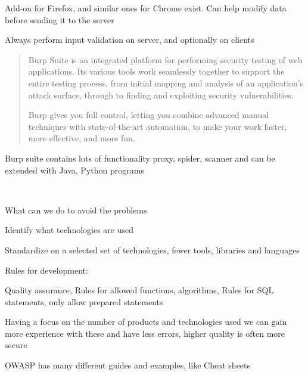 \documentclass[Screen16to9,17pt]{foils}
\begin{document}
Add-on for Firefox, and similar ones for Chrome exist. Can help modify data before sending it to the server\\

Always perform input validation on server, and optionally on clients


\begin{quote}
Burp Suite is an integrated platform for performing security testing of web applications. Its various tools work seamlessly together to support the entire testing process, from initial mapping and analysis of an application's attack surface, through to finding and exploiting security vulnerabilities.

Burp gives you full control, letting you combine advanced manual techniques with state-of-the-art automation, to make your work faster, more effective, and more fun.
\end{quote}

Burp suite contains lots of functionality proxy, spider, scanner and can be extended with Java, Python programs

\\



\begin{list1}
\item What can we do to avoid the problems
\item Identify what technologies are used
\item Standardize on a selected set of technologies, fewer tools, libraries and languages
\item Rules for development:
\begin{list2}
\item Quality assurance, Rules for allowed functions, algorithms, Rules for SQL statements, only allow prepared statements
\end{list2}
\item Having a focus on the number of products and technologies used we can gain more experience with these and have less errors, higher quality is often more secure
\item OWASP has many different guides and examples, like Cheat sheets\\
\end{list1}
\end{document}
